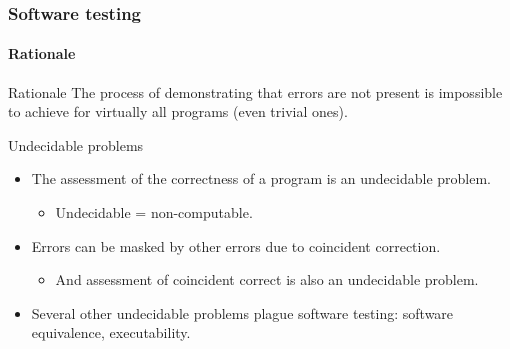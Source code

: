\begin{frame}
\frametitle{Software testing}
\framesubtitle{Rationale}

\begin{block:principle}{Rationale}
The process of demonstrating that errors are not present is impossible to
achieve for virtually all programs (even trivial ones).
\end{block:principle}

\begin{block:fact}{Undecidable problems}
\begin{itemize}
	\item The assessment of the correctness of a program is an undecidable
	problem.
	\begin{itemize}
		\item Undecidable = non-computable.
	\end{itemize}

	\item Errors can be masked by other errors due to coincident correction.
	\begin{itemize}
		\item And assessment of coincident correct is also an undecidable
		problem.
	\end{itemize}

	\item Several other undecidable problems plague software testing: software
	equivalence, executability.
\end{itemize}
\end{block:fact}
\end{frame}


